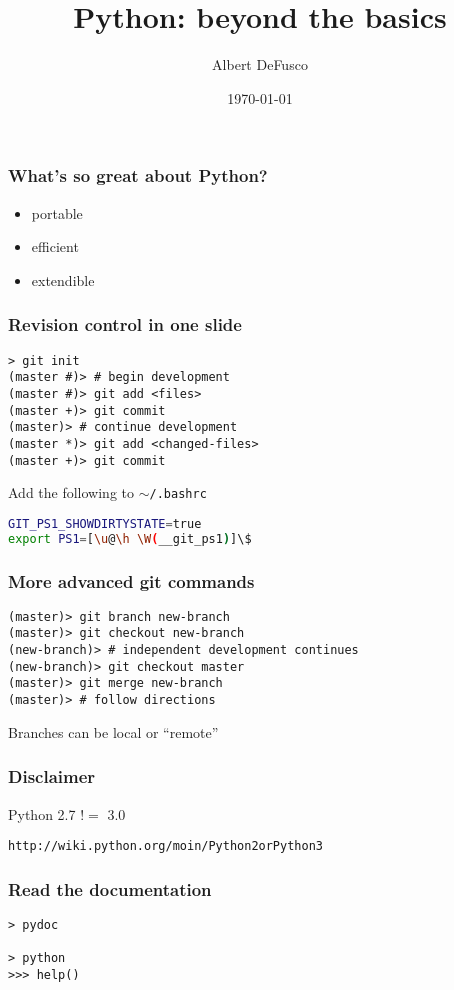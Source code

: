 \documentclass[xcolor=table,10pt,final]{beamer}
\begin{document}
\title{Python: beyond the basics}
\author{Albert DeFusco}
\date{\today}
\frame{\titlepage}

\begin{frame}
  \frametitle{What's so great about Python?}
  \begin{itemize}
    \item portable
    \item efficient
    \item extendible
  \end{itemize}
\end{frame}

\begin{frame}[fragile]
  \frametitle{Revision control in one slide}
  \begin{lstlisting}[basicstyle=\large]
> git init
(master #)> # begin development
(master #)> git add <files>
(master +)> git commit
(master)> # continue development
(master *)> git add <changed-files>
(master +)> git commit
\end{lstlisting}
  \scriptsize{Add the following to {\tt$\sim$/.bashrc}}
  \begin{lstlisting}[language=bash]
GIT_PS1_SHOWDIRTYSTATE=true
export PS1=[\u@\h \W(__git_ps1)]\$
\end{lstlisting}
\end{frame}

\begin{frame}[fragile]
  \frametitle{More advanced git commands}
  \begin{lstlisting}
(master)> git branch new-branch
(master)> git checkout new-branch
(new-branch)> # independent development continues
(new-branch)> git checkout master
(master)> git merge new-branch
(master)> # follow directions
\end{lstlisting}
Branches can be local or ``remote''
\end{frame}


\begin{frame}[fragile]
  \frametitle{Disclaimer}
  Python 2.7 $!=$ 3.0
  \vskip1cm
  \begin{verbatim}
http://wiki.python.org/moin/Python2orPython3
\end{verbatim}
\end{frame}

\begin{frame}[fragile]
  \frametitle{Read the documentation}
  \begin{verbatim}
> pydoc

> python
>>> help()
\end{verbatim}
\end{frame}
\end{document}
